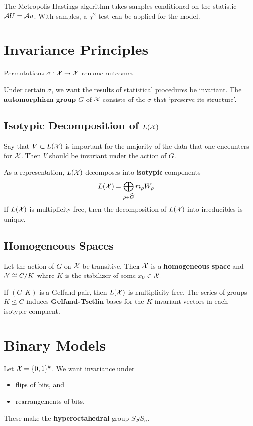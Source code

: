 \documentclass[thesis]{hmcposter}
\newcommand{\mterm}[1]{\textbf{\textcolor{cterm}{#1}}}
\newcommand*{\halfspace}{\vspace{0.5\baselineskip}}
\newcommand*{\nhalfspace}{\vspace{-0.5\baselineskip}}
\newcommand*{\nquarterspace}{\vspace{-0.25\baselineskip}}
\begin{document}
\begin{poster}
The Metropolis-Hastings algorithm takes samples conditioned on the statistic
$\mathcal{A} U = \mathcal{A} u$.  With samples, a $\chi^2$ test can be applied for the model.

\halfspace
\columnbreak

\section{Invariance Principles}
\nhalfspace

Permutations $\sigma: \mathcal{X} \to \mathcal{X}$ rename outcomes.  

Under certain $\sigma$, we want the results of statistical procedures be
invariant.  The \mterm{automorphism group} $G$ of $\mathcal{X}$ consists of the $\sigma$
that `preserve its structure'.

\nhalfspace
\subsection{Isotypic Decomposition of $L(\mathcal{X})$}
\nquarterspace

Say that $V \subset L(\mathcal{X})$ is important for the majority of the data that one
encounters for $\mathcal{X}$.  Then $V$ should be invariant under the action of $G$.

As a representation, $L(\mathcal{X})$ decomposes into \mterm{isotypic} components
\[
    L(\mathcal{X}) = \bigoplus_{\rho \in \widehat G} m_\rho W_\rho.
\]
If $L(\mathcal{X})$ is multiplicity-free, then the decomposition of
$L(\mathcal{X})$ into irreducibles is unique.

\nhalfspace
\subsection{Homogeneous Spaces}
\nquarterspace

Let the action of $G$ on $\mathcal{X}$ be transitive.  Then $\mathcal{X}$ is a
\mterm{homogeneous space} and $\mathcal{X} \cong G / K$ where $K$ is
the stabilizer of some $x_0 \in \mathcal{X}$.

If $(G, K)$ is a Gelfand pair, then $L(\mathcal{X})$ is multiplicity free.  The series
of groups $K \le G$ induces \mterm{Gelfand-Tsetlin} bases for the $K$-invariant
vectors in each isotypic compnent.

\nhalfspace
\section{Binary Models}
\nquarterspace

Let $\mathcal{X} = \{0, 1\}^k$.  We want invariance under
\begin{itemize}
    \item flips of bits, and
    \item rearrangements of bits.
\end{itemize}
These make the \mterm{hyperoctahedral} group \mbox{$S_2 \wr S_n$}.


\end{poster}
\end{document}

